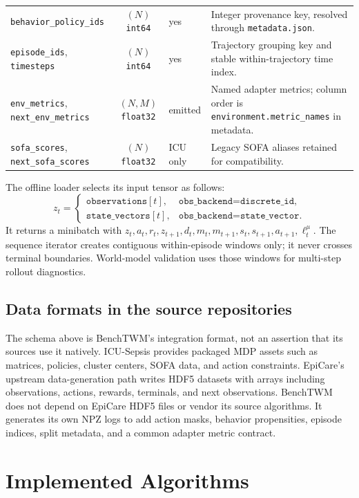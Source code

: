 \documentclass[10pt,twocolumn]{article}
\newcommand{\code}[1]{\texttt{#1}}
\newcommand{\behavior}{\mu}
\begin{document}
\begin{table}[t]
\begin{tabularx}{\textwidth}{lclX}
\code{behavior\_policy\_ids} & $(N)$ \code{int64} & yes & Integer provenance key, resolved through \code{metadata.json}. \\
\code{episode\_ids}, \code{timesteps} & $(N)$ \code{int64} & yes & Trajectory grouping key and stable within-trajectory time index. \\
\code{env\_metrics}, \code{next\_env\_metrics} & $(N,M)$ \code{float32} & emitted & Named adapter metrics; column order is \code{environment.metric\_names} in metadata. \\
\code{sofa\_scores}, \code{next\_sofa\_scores} & $(N)$ \code{float32} & ICU only & Legacy SOFA aliases retained for compatibility. \\
\bottomrule
\end{tabularx}
\end{table}

The offline loader selects its input tensor as follows:
\begin{equation}
 z_t =
 \begin{cases}
     \code{observations}[t], & \code{obs\_backend=discrete\_id},\\
     \code{state\_vectors}[t], & \code{obs\_backend=state\_vector}.
 \end{cases}
\end{equation}
It returns a minibatch with $z_t,a_t,r_t,z_{t+1},d_t,m_t,m_{t+1},s_t,s_{t+1},a_{t+1},\ell_t^{\behavior}$. The sequence iterator creates contiguous within-episode windows only; it never crosses terminal boundaries. World-model validation uses those windows for multi-step rollout diagnostics.

\subsection{Data formats in the source repositories}

The schema above is BenchTWM's integration format, not an assertion that its sources use it natively. ICU-Sepsis provides packaged MDP assets such as matrices, policies, cluster centers, SOFA data, and action constraints. EpiCare's upstream data-generation path writes HDF5 datasets with arrays including observations, actions, rewards, terminals, and next observations. BenchTWM does not depend on EpiCare HDF5 files or vendor its source algorithms. It generates its own NPZ logs to add action masks, behavior propensities, episode indices, split metadata, and a common adapter metric contract.

\section{Implemented Algorithms}
\label{sec:methods}
\end{document}
